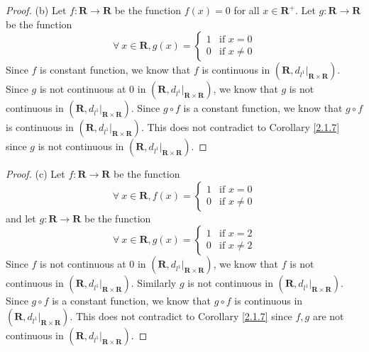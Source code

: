 \begin{proof}{(b)}
    Let \(f : \mathbf{R} \to \mathbf{R}\) be the function \(f(x) = 0\) for all \(x \in \mathbf{R}^+\).
    Let \(g : \mathbf{R} \to \mathbf{R}\) be the function
    \[
        \forall\ x \in \mathbf{R}, g(x) = \begin{cases}
            1 & \text{if } x = 0    \\
            0 & \text{if } x \neq 0
        \end{cases}
    \]
    Since \(f\) is constant function, we know that \(f\) is continuous in \((\mathbf{R}, d_{l^1}|_{\mathbf{R} \times \mathbf{R}})\).
    Since \(g\) is not continuous at \(0\) in \((\mathbf{R}, d_{l^1}|_{\mathbf{R} \times \mathbf{R}})\), we know that \(g\) is not continuous in \((\mathbf{R}, d_{l^1}|_{\mathbf{R} \times \mathbf{R}})\).
    Since \(g \circ f\) is a constant function, we know that \(g \circ f\) is continuous in \((\mathbf{R}, d_{l^1}|_{\mathbf{R} \times \mathbf{R}})\).
    This does not contradict to Corollary \ref{2.1.7} since \(g\) is not continuous in \((\mathbf{R}, d_{l^1}|_{\mathbf{R} \times \mathbf{R}})\).
\end{proof}

\begin{proof}{(c)}
    Let \(f : \mathbf{R} \to \mathbf{R}\) be the function
    \[
        \forall\ x \in \mathbf{R}, f(x) = \begin{cases}
            1 & \text{if } x = 0    \\
            0 & \text{if } x \neq 0
        \end{cases}
    \]
    and let \(g : \mathbf{R} \to \mathbf{R}\) be the function
    \[
        \forall\ x \in \mathbf{R}, g(x) = \begin{cases}
            1 & \text{if } x = 2    \\
            0 & \text{if } x \neq 2
        \end{cases}
    \]
    Since \(f\) is not continuous at \(0\) in \((\mathbf{R}, d_{l^1}|_{\mathbf{R} \times \mathbf{R}})\), we know that \(f\) is not continuous in \((\mathbf{R}, d_{l^1}|_{\mathbf{R} \times \mathbf{R}})\).
    Similarly \(g\) is not continuous in \((\mathbf{R}, d_{l^1}|_{\mathbf{R} \times \mathbf{R}})\).
    Since \(g \circ f\) is a constant function, we know that \(g \circ f\) is continuous in \((\mathbf{R}, d_{l^1}|_{\mathbf{R} \times \mathbf{R}})\).
    This does not contradict to Corollary \ref{2.1.7} since \(f, g\) are not continuous in \((\mathbf{R}, d_{l^1}|_{\mathbf{R} \times \mathbf{R}})\).
\end{proof}

